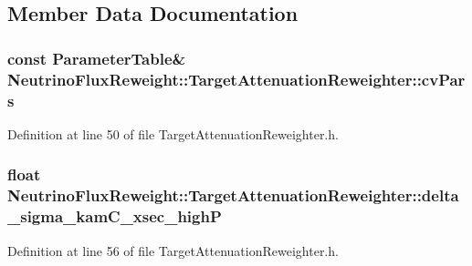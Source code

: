 \subsection{Member Data Documentation}
\hypertarget{class_neutrino_flux_reweight_1_1_target_attenuation_reweighter_a57e907b9b35335e57c20b7280e016725}{
\subsubsection[{cv\-Pars}]{\setlength{\rightskip}{0pt plus 5cm}const {\bf Parameter\-Table}\& Neutrino\-Flux\-Reweight\-::\-Target\-Attenuation\-Reweighter\-::cv\-Pars\hspace{0.3cm}{\ttfamily [private]}}}\label{class_neutrino_flux_reweight_1_1_target_attenuation_reweighter_a57e907b9b35335e57c20b7280e016725}


Definition at line 50 of file Target\-Attenuation\-Reweighter.\-h.

\hypertarget{class_neutrino_flux_reweight_1_1_target_attenuation_reweighter_a95594f470ba874e6497c656e73de5af0}{
\subsubsection[{delta\-\_\-sigma\-\_\-kam\-C\-\_\-xsec\-\_\-high\-P}]{\setlength{\rightskip}{0pt plus 5cm}float Neutrino\-Flux\-Reweight\-::\-Target\-Attenuation\-Reweighter\-::delta\-\_\-sigma\-\_\-kam\-C\-\_\-xsec\-\_\-high\-P\hspace{0.3cm}{\ttfamily [private]}}}\label{class_neutrino_flux_reweight_1_1_target_attenuation_reweighter_a95594f470ba874e6497c656e73de5af0}


Definition at line 56 of file Target\-Attenuation\-Reweighter.\-h.

